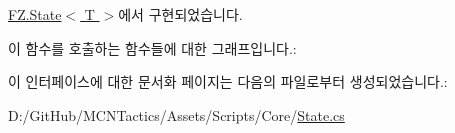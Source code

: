 \hyperlink{class_f_z_1_1_state_acaf1584680a2e69e2a4da20574723981}{F\+Z.\+State$<$ T $>$}에서 구현되었습니다.



이 함수를 호출하는 함수들에 대한 그래프입니다.\+:




이 인터페이스에 대한 문서화 페이지는 다음의 파일로부터 생성되었습니다.\+:\begin{DoxyCompactItemize}
\item 
D\+:/\+Git\+Hub/\+M\+C\+N\+Tactics/\+Assets/\+Scripts/\+Core/\hyperlink{_state_8cs}{State.\+cs}\end{DoxyCompactItemize}
